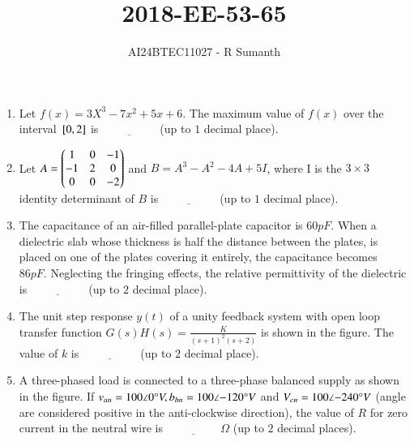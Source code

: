 \documentclass[journal,12pt,onecolumn]{IEEEtran}
\theoremstyle{remark}
\begin{document}

\vspace{3cm}

\title{\textbf{2018-EE-53-65}}
\author{AI24BTEC11027 - R Sumanth}
\maketitle
\bigskip

\renewcommand{\thefigure}{\theenumi}
\renewcommand{\thetable}{\theenumi}
\setlength{\columnsep}{2.5em}
\begin{enumerate}

\item Let $f(x)=3X^3-7x^2+5x+6.$ The maximum value of $f(x)$ over the interval ${}\left[0,2\right]$ is $\underline{\hspace{2cm}}$ (up to $1$ decimal place).\\

\item Let $A=\begin{pmatrix}1 & 0 & -1\\ -1 & 2 & 0\\ 0 & 0 & -2\end{pmatrix}$ and $B=A^3-A^2-4A+5I$, where I is the $3\times3$ identity determinant of $B$ is $\underline{\hspace{2cm}}$ (up to $1$ decimal place).\\

\item The capacitance of an air-filled parallel-plate capacitor is $60 pF.$ When a dielectric slab whose thickness is half the distance between the plates, is placed on one of the plates covering it entirely, the capacitance becomes $86 pF.$ Neglecting the fringing effects, the relative permittivity of the dielectric is $\underline{\hspace{2cm}}$  (up to $2$ decimal place).\\ 

\item The unit step response $y(t)$ of a unity feedback system with open loop transfer function $G(s)H(s)=\frac{K}{(s+1)^2(s+2)}$ is shown in the figure. The value of $k$ is $\underline{\hspace{2cm}}$  (up to $2$ decimal place).



\item A three-phased load is connected to a three-phase balanced supply as shown in the figure. If $v_{an}=100 \angle{0}\degree V,b_{bn}=100\angle{-120}\degree V$ and $V_{cn}=100\angle{-240}\degree V$ (angle are considered positive in the anti-clockwise direction), the value of $R$ for zero current in the neutral wire is $\underline{\hspace{2cm}}\Omega$ (up to $2$ decimal places).\\



\end{enumerate}
\end{document}
